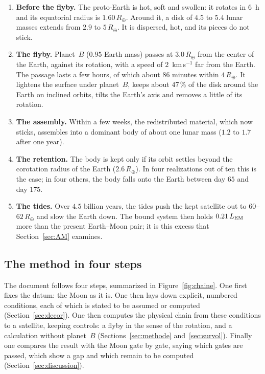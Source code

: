 \documentclass[11pt,a4paper]{article}
\newcommand{\Rt}{\ensuremath{R_\oplus}}
\newcommand{\LEM}{\ensuremath{L_{\rm EM}}}
\begin{document}
\begin{enumerate}[leftmargin=1.6em,itemsep=3pt]
\item \textbf{Before the flyby.} The proto-Earth is hot, soft and swollen: it rotates in $6$~h and its equatorial radius is $1.60\,\Rt$. Around it, a disk of $4.5$ to $5.4$ lunar masses extends from $2.9$ to $5\,\Rt$. It is dispersed, hot, and its pieces do not stick.
\item \textbf{The flyby.} Planet~$B$ ($0.95$ Earth mass) passes at $3.0\,\Rt$ from the center of the Earth, against its rotation, with a speed of $2$~km\,s$^{-1}$ far from the Earth. The passage lasts a few hours, of which about $86$ minutes within $4\,\Rt$. It lightens the surface under planet~$B$, keeps about $47\,\%$ of the disk around the Earth on inclined orbits, tilts the Earth's axis and removes a little of its rotation.
\item \textbf{The assembly.} Within a few weeks, the redistributed material, which now sticks, assembles into a dominant body of about one lunar mass ($1.2$ to $1.7$ after one year).
\item \textbf{The retention.} The body is kept only if its orbit settles beyond the corotation radius of the Earth ($2.6\,\Rt$). In four realizations out of ten this is the case; in four others, the body falls onto the Earth between day $65$ and day $175$.
\item \textbf{The tides.} Over $4.5$ billion years, the tides push the kept satellite out to $60$--$62\,\Rt$ and slow the Earth down. The bound system then holds $0.21\,\LEM$ more than the present Earth--Moon pair; it is this excess that Section~\ref{sec:AM} examines.
\end{enumerate}

\subsection{The method in four steps}

The document follows four steps, summarized in Figure~\ref{fig:chaine}. One first fixes the datum: the Moon as it is. One then lays down explicit, numbered conditions, each of which is stated to be assumed or computed (Section~\ref{sec:decor}). One then computes the physical chain from these conditions to a satellite, keeping controls: a flyby in the sense of the rotation, and a calculation without planet~$B$ (Sections~\ref{sec:methode} and~\ref{sec:survol}). Finally one compares the result with the Moon gate by gate, saying which gates are passed, which show a gap and which remain to be computed (Section~\ref{sec:discussion}).
\end{document}

